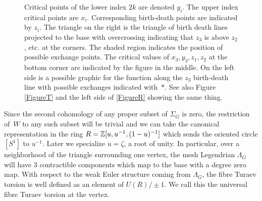\documentclass[11pt]{article}
\newcommand{\smaller}{\small}
\numberwithin{equation}{section}\providecommand{\dpl}{\displaystyle}
\theoremstyle{plain}
\theoremstyle{definition}
\begin{document}
\begin{figure}[htbp]
\begin{center}
\caption{\smaller Critical points of the lower index $2k$ are denoted $y_i$. The upper index critical points are $x_i$. Corresponding birth-death points are indicated by $z_i$. The triangle on the right is the triangle of birth death lines projected to the base with overcrossing indicating that $z_3$ is above $z_2$, etc. at the corners. The shaded region indicates the position of possible exchange points. The critical values of $x_3,y_3,z_1,z_2$ at the bottom corner are indicated by the figure in the middle. On the left side is a possible graphic for the function along the $z_3$ birth-death line with possible exchanges indicated with~$\ast$. See also Figure \ref{FigureT} and the left side of \ref{FigureR} showing the same thing.
}
\label{Fig: birth-death triangle}
\end{center}
\end{figure}

Since the second cohomology of any proper subset of $\Sigma_G$ is zero, the restriction of~$W$ to any such subset will be trivial and we can take the canonical representation in the ring $R=\mathbb{Z}[u,u^{-1},(1-u)^{-1}]$ which sends the oriented circle $[S^1]$ to $u^{-1}$. Later we specialize $u=\zeta$, a root of unity. In particular, over a neighborhood of the triangle surrounding one vertex, the mesh Legendrian $\Lambda_G$ will have 3 contractible components which map to the base with a degree zero map. With respect to the weak Euler structure coming from $\Lambda_G$, the fibre Turaev torsion is well defined as an element of $U(R)/\pm1$.
We call this the universal fibre Turaev torsion at the vertex.
\end{document}
